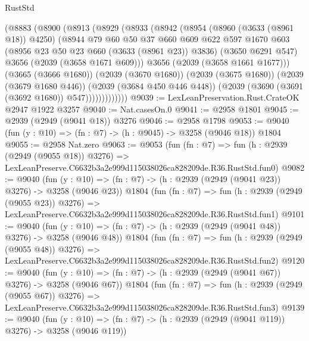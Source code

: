 \begin{lexlean}{RustStd}
\begin{coremodule}
              (@8883
                (@8900
                  (@8913
                    (@8929
                      (@8933
                        (@8942
                          (@8954
                            (@8960 (@3633 (@8961 @18)) @4250)
                            (@8944
                              @79
                              @60
                              @50
                              @37
                              @660
                              @609
                              @622
                              @597
                              @1670
                              @603
                              (@8956 @23 @50 @23 @660 (@3633 (@8961 @23)) @3836)
                              (@3650 @6291 @547)
                              @3656
                              (@2039 (@3658 @1671 @609)))
                            @3656
                            (@2039 (@3658 @1661 @1677)))
                          (@3665 (@3666 @1680))
                          (@2039 (@3670 @1680))
                          (@2039 (@3675 @1680))
                          (@2039 (@3679 @1680 @446))
                          (@2039 (@3684 @450 @446 @448))
                          (@2039 (@3690 (@3691 (@3692 @1680)) @547)))))))))))))
@9039 := LexLeanPreservation.Rust.CrateOK @2947 @1922 @3257
@9040 := Nat.casesOn.{0}
@9041 := @2958 @1801
@9045 := @2939 (@2949 (@9041 @18)) @3276
@9046 := @2958 @1798
@9053 := @9040 (fun (y : @10) => (fn : @7) -> (h : @9045) -> @3258 (@9046 @18)) @1804
@9055 := @2958 Nat.zero
@9063 := @9053
    (fun (fn : @7) =>
    fun (h : @2939 (@2949 (@9055 @18)) @3276) =>
    LexLeanPreserve.C6632b3a2e999d115038026ca828209de.R36.RustStd.fun0)
@9082 := @9040
    (fun (y : @10) => (fn : @7) -> (h : @2939 (@2949 (@9041 @23)) @3276) -> @3258 (@9046 @23))
    @1804
    (fun (fn : @7) =>
    fun (h : @2939 (@2949 (@9055 @23)) @3276) =>
    LexLeanPreserve.C6632b3a2e999d115038026ca828209de.R36.RustStd.fun1)
@9101 := @9040
    (fun (y : @10) => (fn : @7) -> (h : @2939 (@2949 (@9041 @48)) @3276) -> @3258 (@9046 @48))
    @1804
    (fun (fn : @7) =>
    fun (h : @2939 (@2949 (@9055 @48)) @3276) =>
    LexLeanPreserve.C6632b3a2e999d115038026ca828209de.R36.RustStd.fun2)
@9120 := @9040
    (fun (y : @10) => (fn : @7) -> (h : @2939 (@2949 (@9041 @67)) @3276) -> @3258 (@9046 @67))
    @1804
    (fun (fn : @7) =>
    fun (h : @2939 (@2949 (@9055 @67)) @3276) =>
    LexLeanPreserve.C6632b3a2e999d115038026ca828209de.R36.RustStd.fun3)
@9139 := @9040
    (fun (y : @10) => (fn : @7) -> (h : @2939 (@2949 (@9041 @119)) @3276) -> @3258 (@9046 @119))

\end{coremodule}
\end{lexlean}
